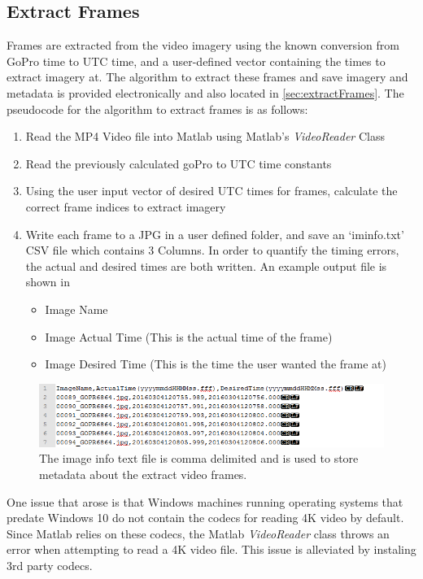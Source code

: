	\subsection{Extract Frames}
	Frames are extracted from the video imagery using the known conversion from GoPro time to UTC time, and a user-defined vector containing the times to extract imagery at.  The algorithm to extract these frames and save imagery and metadata is provided electronically and also located in \ref{sec:extractFrames}. The pseudocode for the algorithm to extract frames is as follows:
	\begin{enumerate}
		\item Read the MP4 Video file into Matlab using Matlab's \textit{VideoReader} Class
		\item Read the previously calculated goPro to UTC time constants
		\item Using the user input vector of desired UTC times for frames, calculate the correct frame indices to extract imagery
		\item Write each frame to a JPG in a user defined folder, and save an `iminfo.txt' CSV file which contains 3 Columns.  In order to quantify the timing errors, the actual and desired times are both written.  An example output file is shown in 
		\begin{itemize}
			\item Image Name
			\item Image Actual Time (This is the actual time of the frame)
			\item Image Desired Time (This is the time the user wanted the frame at)
		\end{itemize}
	\end{enumerate} 
	
	\begin{figure}[H]
		\centering
		\includegraphics[scale = 0.8]{../figures/iminfotxt.png}
		\caption{The image info text file is comma delimited and is used to store metadata about the extract video frames.}
		\label{fig:iminfo}
	\end{figure}
	
	One issue that arose is that Windows machines running operating systems that predate Windows 10 do not contain the codecs for reading 4K video by default.  Since Matlab relies on these codecs, the Matlab \textit{VideoReader} class throws an error when attempting to read a 4K video file.  This issue is alleviated by instaling 3rd party codecs.
	
